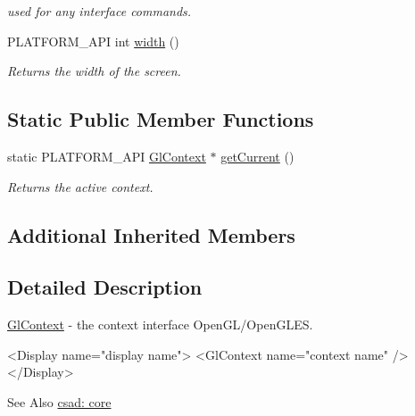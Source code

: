\begin{DoxyCompactItemize}
\begin{DoxyCompactList}\small\item\em used for any interface commands. \end{DoxyCompactList}\item 
\hypertarget{classcsad_1_1_gl_context_a72ef9a9feddc9265b5175b6dacb249ae}{P\-L\-A\-T\-F\-O\-R\-M\-\_\-\-A\-P\-I int \hyperlink{classcsad_1_1_gl_context_a72ef9a9feddc9265b5175b6dacb249ae}{width} ()}\label{classcsad_1_1_gl_context_a72ef9a9feddc9265b5175b6dacb249ae}

\begin{DoxyCompactList}\small\item\em Returns the width of the screen. \end{DoxyCompactList}\end{DoxyCompactItemize}
\subsection*{Static Public Member Functions}
\begin{DoxyCompactItemize}
\item 
\hypertarget{classcsad_1_1_gl_context_a01e495e2d572ec32282abc324a3373bb}{static P\-L\-A\-T\-F\-O\-R\-M\-\_\-\-A\-P\-I \hyperlink{classcsad_1_1_gl_context}{Gl\-Context} $\ast$ \hyperlink{classcsad_1_1_gl_context_a01e495e2d572ec32282abc324a3373bb}{get\-Current} ()}\label{classcsad_1_1_gl_context_a01e495e2d572ec32282abc324a3373bb}

\begin{DoxyCompactList}\small\item\em Returns the active context. \end{DoxyCompactList}\end{DoxyCompactItemize}
\subsection*{Additional Inherited Members}


\subsection{Detailed Description}
\hyperlink{classcsad_1_1_gl_context}{Gl\-Context} -\/ the context interface Open\-G\-L/\-Open\-G\-L\-E\-S. 

\begin{DoxyVerb}  <Display name="display name">
     <GlContext name="context name" />
  </Display>
\end{DoxyVerb}


\begin{DoxySeeAlso}{See Also}
\hyperlink{group__core}{csad\-: core} 
\end{DoxySeeAlso}
